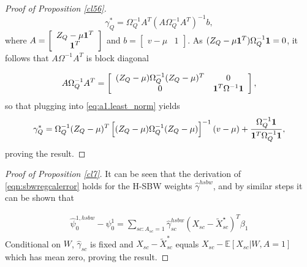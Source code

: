 \begin{proof}[Proof of Proposition \ref{cl56}]
\begin{equation}\label{eq:a1.least_norm}
 \gamma_Q^* = \Omega^{-1}_Q A^T (A\Omega^{-1}_QA^T)^{-1} b,
\end{equation}
where $A = \left[ \begin{array}{c} Z_Q - \mu {\bf 1}^T\\ {\bf 1}^T \end{array}\right]$ and $b = \left[\begin{array}{c} v - \mu & 1 \end{array}\right]$. As $(Z_{Q} - \mu{\bf 1}^T)\Omega_Q^{-1} {\bf 1} = 0$, it follows that $A\Omega^{-1}A^T$ is block diagonal

\[ A\Omega_Q^{-1}A^T = \left[\begin{array}{cc} (Z_Q - \mu)\Omega_Q^{-1} (Z_Q- \mu)^T & 0  \\ 0 & {\bf 1}^T \Omega^{-1}{\bf 1}\end{array}\right], \]
so that plugging into \eqref{eq:a1.least_norm} yields
 \begin{equation*}
 \gamma^*_{Q} = \Omega_{Q}^{-1} (Z_{Q} - \mu)^T\left[ (Z_Q - \mu) \Omega_{Q}^{-1} (Z_Q - \mu)\right]^{-1} (v - \mu) + \frac{\Omega^{-1}_Q {\bf 1} }{{\bf 1}^T \Omega^{-1}_Q {\bf 1}},
 \end{equation*}
proving the result.

\end{proof}    
    

\begin{proof}[Proof of Proposition \ref{cl7}]
   It can be seen that the derivation of \eqref{eqn:sbwregcalerror} holds for the H-SBW weights $\hat{\gamma}^{hsbw}$, and by similar steps it can be shown that 
    
    \begin{align*}
        \hat{\psi}^{1, hsbw}_0 - \psi^1_0 = \sum_{sc: A_{sc} = 1}\hat{\gamma}^{hsbw}_{sc}(X_{sc} - \tilde{X}_{sc}^\star)^T\beta_1
    \end{align*}
Conditional on $W$, $\hat{\gamma}_{sc}$ is fixed and $X_{sc} - \tilde{X}_{sc}^*$ equals $X_{sc} - \mathbb{E}[X_{sc}|W, A=1]$ which has mean zero, proving the result.
\end{proof}

    
    
